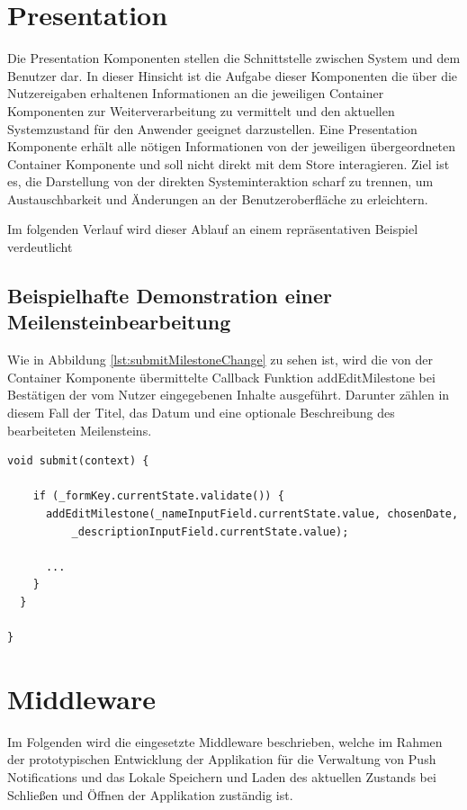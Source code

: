 \documentclass[bibliography=totoc,listof=totoc,BCOR=5mm,DIV=12,oneside]{scrbook}
\begin{document}
\newpage
\section{Presentation}
\par Die Presentation Komponenten stellen die Schnittstelle zwischen System und dem Benutzer dar. In dieser Hinsicht ist die Aufgabe dieser Komponenten die über die Nutzereigaben erhaltenen Informationen an die jeweiligen Container Komponenten zur Weiterverarbeitung zu vermittelt und den aktuellen Systemzustand für den Anwender geeignet darzustellen. Eine Presentation Komponente erhält alle nötigen Informationen von der jeweiligen übergeordneten Container Komponente und soll nicht direkt mit dem Store interagieren. Ziel ist es, die Darstellung von der direkten Systeminteraktion scharf zu trennen, um Austauschbarkeit und Änderungen an der Benutzeroberfläche zu erleichtern.
\par \medskip Im folgenden Verlauf wird dieser Ablauf an einem repräsentativen Beispiel verdeutlicht

\subsection{Beispielhafte Demonstration einer Meilensteinbearbeitung}

\par Wie in Abbildung \ref{lst:submitMilestoneChange} zu sehen ist, wird die von der Container Komponente übermittelte Callback Funktion addEditMilestone bei Bestätigen der vom Nutzer eingegebenen Inhalte ausgeführt.
Darunter zählen in diesem Fall der Titel, das Datum und eine optionale Beschreibung des bearbeiteten Meilensteins.

\bigskip
\begin{lstlisting}[caption={Bestätigung einer Meilensteinänderung Methode},captionpos=b, label=lst:submitMilestoneChange]
void submit(context) {

    if (_formKey.currentState.validate()) {
      addEditMilestone(_nameInputField.currentState.value, chosenDate,
          _descriptionInputField.currentState.value);

      ...
    }
  }
  
}
\end{lstlisting}
\bigskip

\newpage
\section{Middleware}
\label{sec:middleware}
\par Im Folgenden wird die eingesetzte Middleware beschrieben, welche im Rahmen der prototypischen Entwicklung der Applikation für die Verwaltung von Push Notifications und das Lokale Speichern und Laden des aktuellen Zustands bei Schließen und Öffnen der Applikation zuständig ist.
\end{document}

